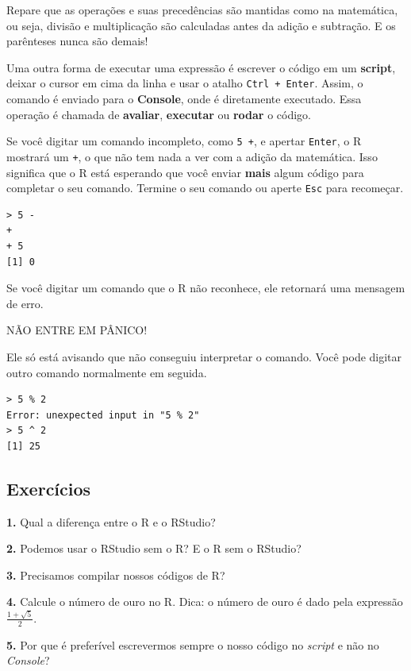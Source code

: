 \documentclass[
]{book}
\begin{document}
Repare que as operações e suas precedências são mantidas como na matemática, ou seja, divisão e multiplicação são calculadas antes da adição e subtração. E os parênteses nunca são demais!

Uma outra forma de executar uma expressão é escrever o código em um \textbf{script}, deixar o cursor em cima da linha e usar o atalho \texttt{Ctrl\ +\ Enter}. Assim, o comando é enviado para o \textbf{Console}, onde é diretamente executado. Essa operação é chamada de \textbf{avaliar}, \textbf{executar} ou \textbf{rodar} o código.

Se você digitar um comando incompleto, como \texttt{5\ +}, e apertar \texttt{Enter}, o R mostrará um \texttt{+}, o que não tem nada a ver com a adição da matemática. Isso significa que o R está esperando que você enviar \textbf{mais} algum código para completar o seu comando. Termine o seu comando ou aperte \texttt{Esc} para recomeçar.

\begin{verbatim}
> 5 -
+ 
+ 5
[1] 0
\end{verbatim}

Se você digitar um comando que o R não reconhece, ele retornará uma mensagem de erro.

NÃO ENTRE EM PÂNICO!

Ele só está avisando que não conseguiu interpretar o comando. Você pode digitar outro comando normalmente em seguida.

\begin{verbatim}
> 5 % 2
Error: unexpected input in "5 % 2"
> 5 ^ 2
[1] 25
\end{verbatim}

\hypertarget{exercuxedcios}{%
\subsection*{Exercícios}\label{exercuxedcios}}

\textbf{1.} Qual a diferença entre o R e o RStudio?

\textbf{2.} Podemos usar o RStudio sem o R? E o R sem o RStudio?

\textbf{3.} Precisamos compilar nossos códigos de R?

\textbf{4.} Calcule o número de ouro no R. Dica: o número de ouro é dado pela expressão \(\frac{1 + \sqrt{5}}{2}\).

\textbf{5.} Por que é preferível escrevermos sempre o nosso código no \emph{script} e não no \emph{Console}?
\end{document}
